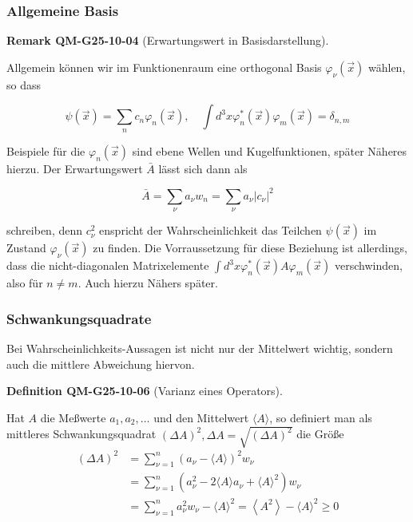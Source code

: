 \documentclass[10pt, letterpaper]{article}
\newcommand{\CustomHeading}[3]{%
  \par\medskip\noindent%
  \textbf{#1 #2} \textnormal{(#3)}.\enskip%
}
\newenvironment{DEF}[2]{\begin{unitbox}\CustomHeading{Definition}{#1}{#2}}{\end{unitbox}}
\newenvironment{REM}[2]{\begin{unitbox}\CustomHeading{Remark}{#1}{#2}}{\end{unitbox}}
\begin{document}
\subsubsection*{Allgemeine Basis}
\begin{REM}{QM-G25-10-04}{Erwartungswert in Basisdarstellung}
Allgemein können wir im Funktionenraum eine orthogonal Basis $\varphi_{\nu}(\vec{x})$ wählen, so dass

$$
\psi(\vec{x})=\sum_{n} c_{n} \varphi_{n}(\vec{x}), \quad \int d^{3} x \varphi_{n}^{*}(\vec{x}) \varphi_{m}(\vec{x})=\delta_{n, m}
$$

Beispiele für die $\varphi_{n}(\vec{x})$ sind ebene Wellen und Kugelfunktionen, später Näheres hierzu. Der Erwartungswert $\bar{A}$ lässt sich dann als

$$
\bar{A}=\sum_{\nu} a_{\nu} w_{n}=\sum_{\nu} a_{\nu}\left|c_{\nu}\right|^{2}
$$

schreiben, denn $c_{\nu}^{2}$ enspricht der Wahrscheinlichkeit das Teilchen $\psi(\vec{x})$ im Zustand $\varphi_{\nu}(\vec{x})$ zu finden. Die Vorraussetzung für diese Beziehung ist allerdings, dass die nicht-diagonalen Matrixelemente $\int d^{3} x \varphi_{n}^{*}(\vec{x}) A \varphi_{m}(\vec{x})$ verschwinden, also für $n \neq m$. Auch hierzu Nähers später.
\end{REM}


\subsubsection*{Schwankungsquadrate}


Bei Wahrscheinlichkeits-Aussagen ist nicht nur der Mittelwert wichtig, sondern auch die mittlere Abweichung hiervon. 



\begin{DEF}{QM-G25-10-06}{Varianz eines Operators}
Hat $A$ die Meßwerte $a_{1}, a_{2}, \ldots$ und den Mittelwert $\langle A\rangle$, so definiert man als mittleres Schwankungsquadrat $(\Delta A)^{2}, \Delta A=\sqrt{(\Delta A)^{2}}$ die Größe
$$
\begin{aligned}
(\Delta A)^{2} & =\sum_{\nu=1}^{n}\left(a_{\nu}-\langle A\rangle\right)^{2} w_{\nu} \\
& =\sum_{\nu=1}^{n}\left(a_{\nu}^{2}-2\langle A\rangle a_{\nu}+\langle A\rangle^{2}\right) w_{\nu} \\
& =\sum_{\nu=1}^{n} a_{\nu}^{2} w_{\nu}-\langle A\rangle^{2}=\left\langle A^{2}\right\rangle-\langle A\rangle^{2} \geq 0
\end{aligned}
$$
\end{DEF}
\end{document}
